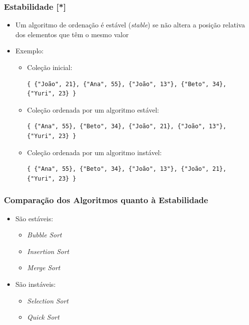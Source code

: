 \documentclass[aspectratio=169]{beamer}
\begin{document}
\begin{frame}[fragile]\frametitle{Estabilidade [*]}
\begin{itemize}	
	\item Um algoritmo de ordenação é estável (\emph{stable}) se não altera a posição relativa dos elementos que têm o mesmo valor
	\item Exemplo:
	\begin{itemize}
		\item Coleção inicial:
\begin{verbatim}
{ {"João", 21}, {"Ana", 55}, {"João", 13"}, {"Beto", 34}, {"Yuri", 23} }
\end{verbatim}
		\item Coleção ordenada por um algoritmo estável:
\begin{verbatim}
{ {"Ana", 55}, {"Beto", 34}, {"João", 21}, {"João", 13"}, {"Yuri", 23} }
\end{verbatim}
		\item Coleção ordenada por um algoritmo instável:
\begin{verbatim}
{ {"Ana", 55}, {"Beto", 34}, {"João", 13"}, {"João", 21}, {"Yuri", 23} }
\end{verbatim}
	\end{itemize}
\end{itemize}
\end{frame}

\begin{frame}\frametitle{Comparação dos Algoritmos quanto à Estabilidade}
\begin{itemize}	
	\item São estáveis:
	\begin{itemize}	
		\item \emph{Bubble Sort}
		\item \emph{Insertion Sort}
		\item \emph{Merge Sort}
	\end{itemize}
	\item São instáveis:
	\begin{itemize}	
		\item \emph{Selection Sort}
		\item \emph{Quick Sort}
	\end{itemize}
\end{itemize}
\end{frame}
\end{document}
